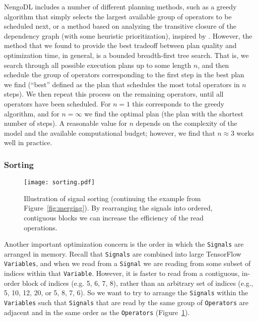 \documentclass{article}
\begin{document}
NengoDL includes a number of different planning methods, such as a greedy algorithm that simply selects the largest available group of operators to be scheduled next, or a method based on analyzing the transitive closure of the dependency graph (with some heuristic prioritization), inspired by \citet{Gosmann2017}.  However, the method that we found to provide the best tradeoff between plan quality and optimization time, in general, is a bounded breadth-first tree search.  That is, we search through all possible execution plans up to some length $n$, and then schedule the group of operators corresponding to the first step in the best plan we find (``best'' defined as the plan that schedules the most total operators in $n$ steps).  We then repeat this process on the remaining operators, until all operators have been scheduled.  For $n=1$ this corresponds to the greedy algorithm, and for $n=\infty$ we find the optimal plan (the plan with the shortest number of steps).  A reasonable value for $n$ depends on the complexity of the model and the available computational budget; however, we find that $n \approx 3$ works well in practice.

\subsubsection{Sorting}

\begin{figure}
\centering
\texttt{[image: sorting.pdf]}
\caption{Illustration of signal sorting (continuing the example from Figure~\ref{fig:merging}).  By rearranging the signals into ordered, contiguous blocks we can increase the efficiency of the read operations.}
\label{fig:sorting}
\end{figure}

Another important optimization concern is the order in which the \texttt{Signals} are arranged in memory.  Recall that \texttt{Signals} are combined into large TensorFlow \texttt{Variables}, and when we read from a \texttt{Signal} we are reading from some subset of indices within that \texttt{Variable}.  However, it is faster to read from a contiguous, in-order block of indices (e.g. 5, 6, 7, 8), rather than an arbitrary set of indices (e.g., 5, 10, 12, 20, or 5, 8, 7, 6).  So we want to try to arrange the \texttt{Signals} within the \texttt{Variables} such that \texttt{Signals} that are read by the same group of \texttt{Operators} are adjacent and in the same order as the \texttt{Operators} (Figure~\ref{fig:sorting}).
\end{document}
